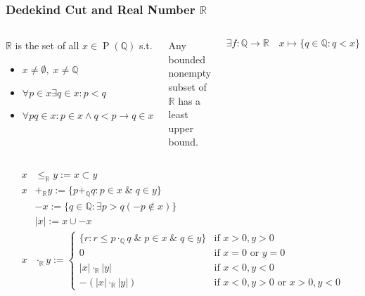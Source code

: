 \documentclass[UTF8,aspectratio=43,11pt,colorlinks,compress,openany]{beamer}%
\begin{document}
\begin{frame}\frametitle{Dedekind Cut and Real Number $\mathbb{R}$}
	\begin{columns}
	\begin{definition}
		$\mathbb{R}$ is the set of all $x\in \operatorname{P}(\mathbb{Q})$ s.t.
		\begin{itemize}
			\item $x\neq\emptyset,\;x\neq\mathbb{Q}$
			\item $\forall p\in x\exists q\in x: p<q$
			\item $\forall pq\in x: p\in x\wedge q<p\to q\in x$
		\end{itemize}
	\end{definition}
	\begin{theorem}
		Any bounded nonempty subset of $\mathbb{R}$ has a least upper bound.
	\end{theorem}\vspace{-3ex}
	\[\exists f:\mathbb{Q}\to\mathbb{R}\quad x\mapsto\{q\in\mathbb{Q}: q<x\}\]
	\end{columns}\vspace{-1ex}
	\begin{align*}
		x&\leq_{\mathbb{R}}y:=x\subset y\\
		x&+_{\mathbb{R}}y:=\{p+_{\mathbb{Q}}q: p\in x\;\&\;q\in y\}\\
		&-x:=\{q\in\mathbb{Q}: \exists p>q(-p\notin x)\}\\
		&|x|:=x\cup-x\\
		x&\cdot_{\mathbb{R}}y:=
		\begin{cases}
			\{r: r\leq p\cdot_{\mathbb{Q}}q\;\&\;p\in x\;\&\;q\in y\} &\mbox{if $x>0, y>0$}\\
			0 &\mbox{if $x=0$ or $y=0$}\\
			|x|\cdot_{\mathbb{R}}|y| &\mbox{if $x<0, y<0$}\\
			-(|x|\cdot_{\mathbb{R}}|y|) &\mbox{if $x<0,y>0$ or $x>0,y<0$}
		\end{cases}
	\end{align*}
\end{frame}
\end{document}
